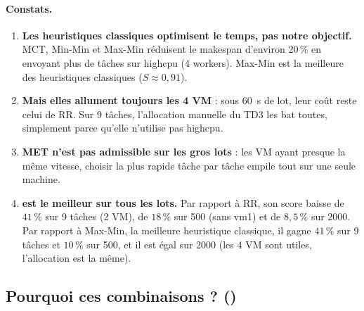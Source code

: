 \paragraph{Constats.}
\begin{enumerate}
  \item \textbf{Les heuristiques classiques optimisent le temps, pas notre
        objectif.} MCT, Min-Min et Max-Min réduisent le makespan d'environ 20\,\%
        en envoyant plus de tâches sur highcpu (4 workers). Max-Min est la meilleure
        des heuristiques classiques ($S \approx 0{,}91$).
  \item \textbf{Mais elles allument toujours les 4 VM} : sous 60~s de lot, leur coût
        reste celui de RR. Sur 9 tâches, l'allocation manuelle du TD3 les bat toutes,
        simplement parce qu'elle n'utilise pas highcpu.
  \item \textbf{MET n'est pas admissible sur les gros lots} : les VM ayant presque
        la même vitesse, choisir la plus rapide tâche par tâche empile tout sur une
        seule machine.
  \item \textbf{\sel{} est le meilleur sur tous les lots.} Par rapport à RR, son
        score baisse de $41\,\%$ sur 9 tâches (2 VM), de $18\,\%$ sur 500 (sans
        vm1) et de $8{,}5\,\%$ sur 2000. Par rapport à Max-Min, la meilleure heuristique
        classique, il gagne $41\,\%$ sur 9 tâches et $10\,\%$ sur 500, et il est
        égal sur 2000 (les 4 VM sont utiles, l'allocation est la même).
\end{enumerate}

\subsection{Pourquoi ces combinaisons ? ()}

